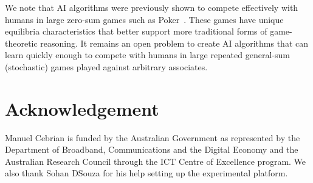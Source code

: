 \documentclass[fleqn,10pt]{SelfArx}
\begin{document}
We note that AI algorithms were previously shown to compete effectively with humans in large zero-sum games such as Poker~\cite{PolarisPokerChampion}.  These games have unique equilibria characteristics that better support more traditional forms of game-theoretic reasoning.  It remains an open problem to create AI algorithms that can learn quickly enough to compete with humans in large repeated general-sum (stochastic) games played against arbitrary associates.

\section{Acknowledgement}
Manuel Cebrian is funded by the Australian Government as represented by the Department of Broadband, Communications and the Digital Economy and the Australian Research Council through the ICT Centre of Excellence program. We also thank Sohan DSouza for his help setting up the experimental platform.






\end{document}
